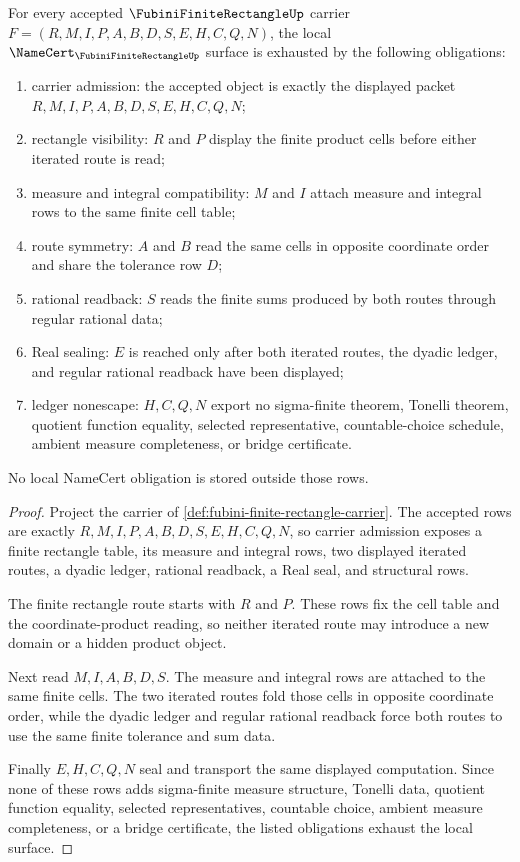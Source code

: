 \begin{theorem}
\label{thm:fubini-finite-rectangle-namecert-obligations}
For every accepted $\FubiniFiniteRectangleUp$ carrier $F=(R,M,I,P,A,B,D,S,E,H,C,Q,N)$, the local $\NameCert_{\FubiniFiniteRectangleUp}$ surface is exhausted by the following obligations:
\begin{enumerate}
\item carrier admission: the accepted object is exactly the displayed packet $R,M,I,P,A,B,D,S,E,H,C,Q,N$;
\item rectangle visibility: $R$ and $P$ display the finite product cells before either iterated route is read;
\item measure and integral compatibility: $M$ and $I$ attach measure and integral rows to the same finite cell table;
\item route symmetry: $A$ and $B$ read the same cells in opposite coordinate order and share the tolerance row $D$;
\item rational readback: $S$ reads the finite sums produced by both routes through regular rational data;
\item Real sealing: $E$ is reached only after both iterated routes, the dyadic ledger, and regular rational readback have been displayed;
\item ledger nonescape: $H,C,Q,N$ export no sigma-finite theorem, Tonelli theorem, quotient function equality, selected representative, countable-choice schedule, ambient measure completeness, or bridge certificate.
\end{enumerate}
No local NameCert obligation is stored outside those rows.
\end{theorem}
\begin{proof}
Project the carrier of \autoref{def:fubini-finite-rectangle-carrier}. The accepted rows are exactly $R,M,I,P,A,B,D,S,E,H,C,Q,N$, so carrier admission exposes a finite rectangle table, its measure and integral rows, two displayed iterated routes, a dyadic ledger, rational readback, a Real seal, and structural rows.

The finite rectangle route starts with $R$ and $P$. These rows fix the cell table and the coordinate-product reading, so neither iterated route may introduce a new domain or a hidden product object.

Next read $M,I,A,B,D,S$. The measure and integral rows are attached to the same finite cells. The two iterated routes fold those cells in opposite coordinate order, while the dyadic ledger and regular rational readback force both routes to use the same finite tolerance and sum data.

Finally $E,H,C,Q,N$ seal and transport the same displayed computation. Since none of these rows adds sigma-finite measure structure, Tonelli data, quotient function equality, selected representatives, countable choice, ambient measure completeness, or a bridge certificate, the listed obligations exhaust the local surface.
\end{proof}

